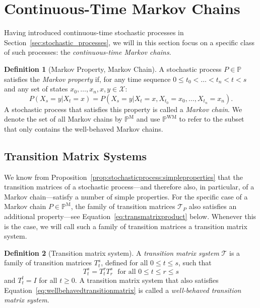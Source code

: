 \documentclass[10pt]{paper}
\theoremstyle{definition}
\newtheorem{definition}{Definition}
\newcommand{\states}{\mathcal{X}}
\newcommand{\processes}{\mathbb{P}}
\newcommand{\mprocesses}{\processes^{\mathrm{M}}}
\newcommand{\wmprocesses}{\processes^{\mathrm{WM}}}
\begin{document}
\section{Continuous-Time Markov Chains}\label{sec:cont_time_markov_chains}

Having introduced continuous-time stochastic processes in Section~\ref{sec:stochastic_processes}, we will in this section focus on a specific class of such processes: the \emph{continuous-time Markov chains}.

\begin{definition}[Markov Property, Markov Chain]\label{def:markov_property}
A stochastic process $P\in\processes$ satisfies the \emph{Markov property} if, for any time sequence $0\leq t_0<\dots<t_{n}<t<s$ and any set of states $x_{0},\dots,x_{n},x,y\in\states$:
\begin{equation*}
P(X_s=y\vert X_{t}=x)=P(X_s=y\vert X_t=x, X_{t_0}=x_{0}, \dots, X_{t_n}=x_{n}).
\end{equation*}
A stochastic process that satisfies this property is called a \emph{Markov chain}. We denote the set of all Markov chains by $\mprocesses$ and use $\wmprocesses$ to refer to the subset that only contains the well-behaved Markov chains.
\end{definition}

\subsection{Transition Matrix Systems}

We know from Proposition~\ref{prop:stochasticprocess:simpleproperties} that the transition matrices of a stochastic process---and therefore also, in particular, of a Markov chain---satisfy a number of simple properties. For the specific case of a Markov chain $P\in\mprocesses$, the family of transition matrices $\mathcal{T}_P$ also satisfies an additional property---see Equation~\eqref{eq:transmatrixproduct} below. Whenever this is the case, we will call such a family of transition matrices a transition matrix system.

\begin{definition}[Transition matrix system]
A \emph{transition matrix system} $\mathcal{T}$ is a family of transition matrices $T_t^s$, defined for all $0\leq t\leq s$, such that
\begin{equation}\label{eq:transmatrixproduct}
T_t^s=T_t^r T_r^s
\text{~~for all $0\leq t\leq r\leq s$}
\end{equation}
and $T_t^t=I$ for all $t\geq0$. A transition matrix system that also satisfies Equation~\eqref{eq:wellbehavedtransitionmatrix} is called a \emph{well-behaved transition matrix system}.
\end{definition}
\end{document}
